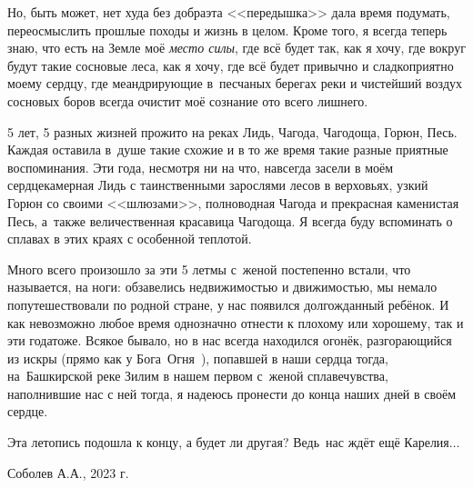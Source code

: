 {Но, быть может, нет худа без добра\mdash эта <<передышка>> дала время подумать, переосмыслить прошлые походы и жизнь в целом. Кроме того, я всегда теперь знаю, что есть на Земле моё \textit{место силы}, где всё будет так, как я хочу, где вокруг будут такие сосновые леса, как я хочу, где всё будет привычно и сладко\sdash приятно моему сердцу, где меандрирующие в~песчаных берегах реки и чистейший воздух сосновых боров всегда очистит моё сознание ото всего лишнего.

5 лет, 5 разных жизней прожито на реках Лидь, Чагода, Чагодоща, Горюн, Песь. Каждая оставила в~душе такие схожие и в то же время такие разные приятные воспоминания. Эти года, несмотря ни на что, навсегда засели в моём сердце\mdash камерная Лидь с таинственными зарослями лесов в верховьях, узкий Горюн со своими <<шлюзами>>, полноводная Чагода и прекрасная каменистая Песь, а~также величественная красавица Чагодоща. Я всегда буду вспоминать о сплавах в этих краях с особенной теплотой.

Много всего произошло за эти 5 лет\mdash мы с~женой постепенно встали, что называется, на ноги: обзавелись недвижимостью и движимостью, мы немало попутешествовали по родной стране, у нас появился долгожданный ребёнок. И как невозможно любое время однозначно отнести к плохому или хорошему, так и эти года\mdash тоже. Всякое бывало, но в нас всегда находился огонёк, разгорающийся из искры (прямо как у Бога~Огня~\cite{Территория}), попавшей в наши сердца тогда, на~Башкирской реке Зилим в нашем первом с~женой сплаве\mdash чувства, наполнившие нас с ней тогда, я надеюсь пронести до конца наших дней в своём сердце.

Эта летопись подошла к концу, а будет ли другая? Ведь~нас ждёт ещё Карелия$\ldots$


}
\vspace{5mm}
\begin{flushright}
Соболев А.А., 2023 г.
\end{flushright}
